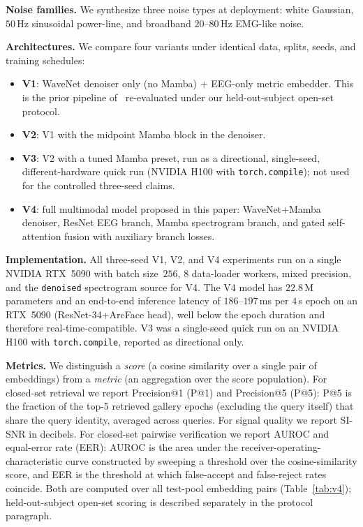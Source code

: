 \documentclass{IEEEtran}
\begin{document}
\textbf{Noise families.} We synthesize three noise types at deployment:
white Gaussian, $50$\,Hz sinusoidal power-line, and broadband
$20$--$80$\,Hz EMG-like noise.

\textbf{Architectures.} We compare four variants under identical data,
splits, seeds, and training schedules:
\begin{itemize}
\item \textbf{V1}: WaveNet denoiser only (no Mamba) + EEG-only metric
embedder. This is the prior pipeline of~\cite{b1} re-evaluated under our
held-out-subject open-set protocol.
\item \textbf{V2}: V1 with the midpoint Mamba block in the denoiser.
\item \textbf{V3}: V2 with a tuned Mamba preset, run as a directional,
single-seed, different-hardware quick run (NVIDIA H100 with
\texttt{torch.compile}); not used for the controlled three-seed claims.
\item \textbf{V4}: full multimodal model proposed in this paper:
WaveNet+Mamba denoiser, ResNet EEG branch, Mamba spectrogram branch, and
gated self-attention fusion with auxiliary branch losses.
\end{itemize}

\textbf{Implementation.} All three-seed V1, V2, and V4 experiments run
on a single NVIDIA RTX~5090 with batch size~$256$, $8$ data-loader
workers, mixed precision, and the \texttt{denoised} spectrogram source
for V4. The V4 model has $22.8$\,M parameters and an end-to-end
inference latency of $186$--$197$\,ms per $4$\,s epoch on an RTX~5090
(ResNet-34+ArcFace head), well below the epoch duration and therefore
real-time-compatible. V3 was a single-seed quick run on an NVIDIA H100
with \texttt{torch.compile}, reported as directional only.

\textbf{Metrics.} We distinguish a \emph{score} (a cosine similarity over
a single pair of embeddings) from a \emph{metric} (an aggregation over
the score population). For closed-set retrieval we report Precision@1
(P@1) and Precision@5 (P@5): P@5 is the fraction of the top-5 retrieved
gallery epochs (excluding the query itself) that share the query
identity, averaged across queries. For signal quality we report SI-SNR
in decibels. For closed-set pairwise verification we report AUROC and
equal-error rate (EER): AUROC is the area under the
receiver-operating-characteristic curve constructed by sweeping a
threshold over the cosine-similarity score, and EER is the threshold at
which false-accept and false-reject rates coincide. Both are computed
over all test-pool embedding pairs (Table~\ref{tab:v4}); held-out-subject
open-set scoring is described separately in the protocol paragraph.
\end{document}

